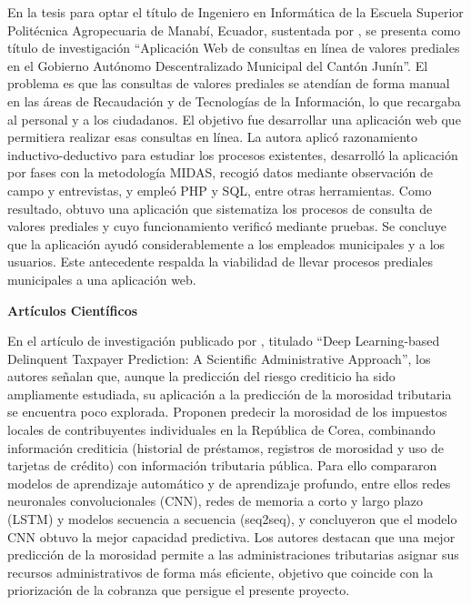 \documentclass[12pt,a4paper]{report}
\newcommand{\subtitulo}[1]{\par\vspace{4pt}\noindent\textbf{#1}\par}
\begin{document}
En la tesis para optar el título de Ingeniero en Informática de la Escuela Superior Politécnica Agropecuaria de Manabí, Ecuador, sustentada por \textcite{pinargote2018}, se presenta como título de investigación ``Aplicación Web de consultas en línea de valores prediales en el Gobierno Autónomo Descentralizado Municipal del Cantón Junín''. El problema es que las consultas de valores prediales se atendían de forma manual en las áreas de Recaudación y de Tecnologías de la Información, lo que recargaba al personal y a los ciudadanos. El objetivo fue desarrollar una aplicación web que permitiera realizar esas consultas en línea. La autora aplicó razonamiento inductivo-deductivo para estudiar los procesos existentes, desarrolló la aplicación por fases con la metodología MIDAS, recogió datos mediante observación de campo y entrevistas, y empleó PHP y SQL, entre otras herramientas. Como resultado, obtuvo una aplicación que sistematiza los procesos de consulta de valores prediales y cuyo funcionamiento verificó mediante pruebas. Se concluye que la aplicación ayudó considerablemente a los empleados municipales y a los usuarios. Este antecedente respalda la viabilidad de llevar procesos prediales municipales a una aplicación web.

\subtitulo{Artículos Científicos}

En el artículo de investigación publicado por \textcite{leekim2024}, titulado ``Deep Learning-based Delinquent Taxpayer Prediction: A Scientific Administrative Approach'', los autores señalan que, aunque la predicción del riesgo crediticio ha sido ampliamente estudiada, su aplicación a la predicción de la morosidad tributaria se encuentra poco explorada. Proponen predecir la morosidad de los impuestos locales de contribuyentes individuales en la República de Corea, combinando información crediticia (historial de préstamos, registros de morosidad y uso de tarjetas de crédito) con información tributaria pública. Para ello compararon modelos de aprendizaje automático y de aprendizaje profundo, entre ellos redes neuronales convolucionales (CNN), redes de memoria a corto y largo plazo (LSTM) y modelos secuencia a secuencia (seq2seq), y concluyeron que el modelo CNN obtuvo la mejor capacidad predictiva. Los autores destacan que una mejor predicción de la morosidad permite a las administraciones tributarias asignar sus recursos administrativos de forma más eficiente, objetivo que coincide con la priorización de la cobranza que persigue el presente proyecto.
\end{document}
